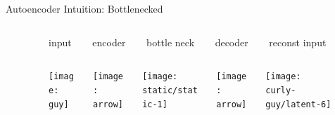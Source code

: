 \begin{frame}{Autoencoder Intuition: Bottlenecked}

\begin{figure}

  \begin{columns}
  \begin{column}{0.07\textwidth}
  \end{column}
  \begin{column}{0.6\textwidth}
  \small
  \centering
  \begin{columns}
  \begin{column}{0.225\textwidth}
  \centering
  input
  \end{column}
  \begin{column}{0.2\textwidth}
  \centering
  encoder
  \end{column}
  \begin{column}{0.15\textwidth}
  \centering
  bottle neck
  \end{column}
  \begin{column}{0.2\textwidth}
  \centering
  decoder
  \end{column}
  \begin{column}{0.225\textwidth}
  \centering
  reconst input
  \end{column}
  \end{columns}

  \vspace{1ex}

  \begin{columns}
  \begin{column}{0.225\textwidth}
  \centering
  \texttt{[image: guy]}
  \end{column}
  \begin{column}{0.2\textwidth}
  \centering
  \texttt{[image: arrow]}
  \end{column}
  \begin{column}{0.15\textwidth}
  \centering
  \texttt{[image: static/static-1]}
  \end{column}
  \begin{column}{0.2\textwidth}
  \centering
  \texttt{[image: arrow]}
  \end{column}
  \begin{column}{0.225\textwidth}
  \centering
  \texttt{[image: curly-guy/latent-6]}
  \end{column}
  \end{columns}

  \vspace*{1.5ex}


\end{column}
\end{columns}
\end{figure}
\end{frame}
